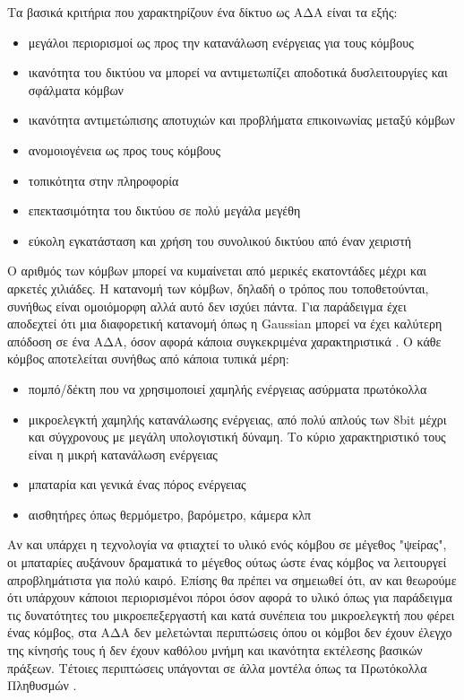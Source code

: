 Τα βασικά κριτήρια που χαρακτηρίζουν ένα δίκτυο ως ΑΔΑ είναι τα εξής:
\begin{itemize}
\item μεγάλοι περιορισμοί ως προς την κατανάλωση ενέργειας για τους κόμβους
\item ικανότητα του δικτύου να μπορεί να αντιμετωπίζει αποδοτικά δυσλειτουργίες και σφάλματα κόμβων
\item ικανότητα αντιμετώπισης αποτυχιών και προβλήματα επικοινωνίας μεταξύ κόμβων
\item ανομοιογένεια ως προς τους κόμβους
\item τοπικότητα στην πληροφορία
\item επεκτασιμότητα του δικτύου σε πολύ μεγάλα μεγέθη
\item εύκολη εγκατάσταση και χρήση του συνολικού δικτύου από έναν χειριστή
\end{itemize}
Ο αριθμός των κόμβων μπορεί να κυμαίνεται από μερικές εκατοντάδες μέχρι και αρκετές χιλιάδες.
Η κατανομή των κόμβων, δηλαδή ο τρόπος που τοποθετούνται, συνήθως είναι ομοιόμορφη αλλά αυτό δεν ισχύει πάντα. Για παράδειγμα έχει αποδεχτεί ότι μια διαφορετική
κατανομή όπως η Gaussian μπορεί να έχει καλύτερη απόδοση σε ένα ΑΔΑ, όσον αφορά κάποια συγκεκριμένα χαρακτηριστικά \cite{gaussian_sensors}.
Ο κάθε κόμβος αποτελείται συνήθως από κάποια τυπικά μέρη:
\begin{itemize}
\item πομπό/δέκτη που να χρησιμοποιεί χαμηλής ενέργειας ασύρματα πρωτόκολλα
\item μικροελεγκτή χαμηλής κατανάλωσης ενέργειας, από πολύ απλούς των 8bit μέχρι και σύγχρονους με μεγάλη υπολογιστική δύναμη. Το κύριο χαρακτηριστικό τους είναι η
μικρή κατανάλωση ενέργειας
\item μπαταρία και γενικά ένας πόρος ενέργειας
\item αισθητήρες όπως θερμόμετρο, βαρόμετρο, κάμερα κλπ
\end{itemize}
Αν και υπάρχει η τεχνολογία να φτιαχτεί το υλικό ενός κόμβου σε μέγεθος "ψείρας", οι μπαταρίες αυξάνουν δραματικά το μέγεθος ούτως ώστε ένας κόμβος να λειτουργεί
απροβλημάτιστα για πολύ καιρό.
Επίσης θα πρέπει να σημειωθεί ότι, αν και θεωρούμε ότι υπάρχουν κάποιοι περιορισμένοι πόροι όσον αφορά το υλικό όπως για παράδειγμα τις δυνατότητες
του μικροεπεξεργαστή και κατά συνέπεια του μικροελεγκτή που φέρει ένας κόμβος, στα ΑΔΑ δεν μελετώνται περιπτώσεις όπου οι κόμβοι δεν έχουν έλεγχο της κίνησής τους ή
δεν έχουν καθόλου μνήμη και ικανότητα εκτέλεσης βασικών πράξεων.
Τέτοιες περιπτώσεις υπάγονται σε άλλα μοντέλα όπως τα Πρωτόκολλα Πληθυσμών \cite{population_protocols}.

